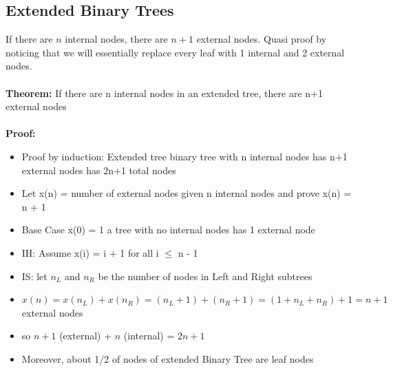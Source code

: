 \documentclass{article}
\begin{document}
  \subsection{Extended Binary Trees}
  If there are $n$ internal nodes, there are $n + 1$ external nodes. Quasi proof by noticing that we will essentially replace every leaf with 1 internal and 2 external nodes.\\  \\
  \textbf{Theorem: }If there are n internal nodes in an extended tree, there are n+1 external nodes\\ \\
  \textbf{Proof: } 
  \begin{itemize}[noitemsep]
  \item Proof by induction: Extended tree binary tree with n internal nodes has n+1 external nodes has 2n+1 total nodes
  \item Let x(n) = number of external nodes given n internal nodes and prove x(n) = n + 1
  \item Base Case x(0) = 1 a tree with no internal nodes has 1 external node
  \item IH: Assume x(i) = i + 1 for all i $\leq$ n - 1
  \item IS: let $n_{L}$ and $n_{R}$ be the number of nodes in Left and Right subtrees
  \item $x(n) = x(n_{L}) + x(n_{R}) = (n_{L} + 1) + (n_{R} + 1) = (1 + n_{L} + n_{R}) + 1 = n + 1$ external nodes
  \item so $n + 1$ (external) + $n$ (internal) = $2n + 1$
  \item Moreover, about 1/2 of nodes of extended Binary Tree are leaf nodes
  \end{itemize}
\end{document}
